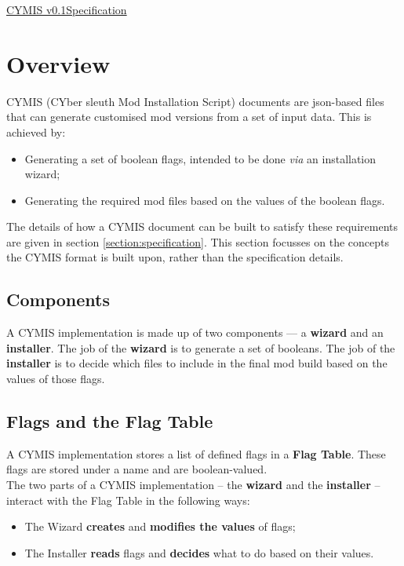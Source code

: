 \documentclass{article}
\newcommand{\cymisversion}{0.1}
\begin{document}
\thispagestyle{empty}

\begin{center}
\huge\underline{CYMIS v\cymisversion\space Specification}
\end{center}
\tableofcontents
\clearpage
{} 

\section{Overview}
CYMIS (CYber sleuth Mod Installation Script) documents are json-based files that can generate customised mod versions from a set of input data. This is achieved by:
\begin{itemize}
\item Generating a set of boolean flags, intended to be done \textit{via} an installation wizard;
\item Generating the required mod files based on the values of the boolean flags.
\end{itemize}
The details of how a CYMIS document can be built to satisfy these requirements are given in section \ref{section:specification}. This section focusses on the concepts the CYMIS format is built upon, rather than the specification details.

\subsection{Components}
A CYMIS implementation is made up of two components --- a \textbf{wizard} and an \textbf{installer}. The job of the \textbf{wizard} is to generate a set of booleans. The job of the \textbf{installer} is to decide which files to include in the final mod build based on the values of those flags.

\subsection{Flags and the Flag Table}
A CYMIS implementation stores a list of defined flags in a \textbf{Flag Table}. These flags are stored under a name and are boolean-valued.\\
The two parts of a CYMIS implementation -- the \textbf{wizard} and the \textbf{installer} -- interact with the Flag Table in the following ways:
\begin{itemize}
\item The Wizard \textbf{creates} and \textbf{modifies the values} of flags;
\item The Installer \textbf{reads} flags and \textbf{decides} what to do based on their values.
\end{itemize}
\end{document}

